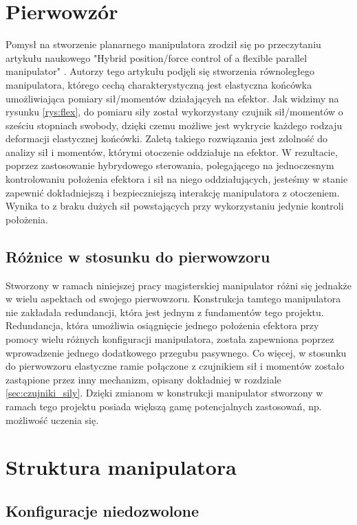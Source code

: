 \documentclass[printmode]{mgr}
\begin{document}
\chapter{Pierwowzór} \label{ch:pierwowzor}
Pomysł na stworzenie planarnego manipulatora zrodził się po przeczytaniu artykułu naukowego
"Hybrid position/force control of a flexible parallel manipulator" \cite{wzor}. 
Autorzy tego artykułu podjęli się stworzenia równoległego manipulatora, którego cechą charakterystyczną
jest elastyczna końcówka umożliwiająca pomiary sił/momentów działających na efektor. 
Jak widzimy na rysunku \ref{rys:flex}, do pomiaru siły został wykorzystany czujnik sił/momentów
o sześciu stopniach swobody, dzięki czemu możliwe jest wykrycie każdego rodzaju deformacji elastycznej
końcówki. Zaletą takiego rozwiązania jest zdolność do analizy sił i momentów, którymi otoczenie
oddziałuje na efektor. W rezultacie, poprzez zastosowanie hybrydowego sterowania, polegającego
na jednoczesnym kontrolowaniu położenia efektora i sił na niego oddziałujących, jesteśmy w stanie zapewnić
dokładniejszą i bezpieczniejszą interakcję manipulatora z otoczeniem. Wynika to z braku dużych sił powstających
przy wykorzystaniu jedynie kontroli położenia.


\section{Różnice w stosunku do pierwowzoru}
Stworzony w ramach niniejszej pracy magisterskiej manipulator różni się jednakże w wielu aspektach od
swojego pierwowzoru. Konstrukcja tamtego manipulatora nie zakładała redundancji, która jest jednym z
fundamentów tego projektu. Redundancja, która umożliwia osiągnięcie jednego położenia efektora przy pomocy
wielu różnych konfiguracji manipulatora, została zapewniona poprzez wprowadzenie jednego dodatkowego przegubu
pasywnego. Co więcej, w stosunku do pierwowzoru elastyczne ramie połączone z czujnikiem sił i momentów
zostało zastąpione przez inny mechanizm, opisany dokładniej w rozdziale \ref{sec:czujniki_sily}.
Dzięki zmianom w konstrukcji manipulator stworzony w ramach tego projektu posiada większą gamę
potencjalnych zastosowań, np. możliwość uczenia się. 

\chapter{Struktura manipulatora}

\section{Konfiguracje niedozwolone}\label{sec:konfiguracje_niedozwolone}
\end{document}
